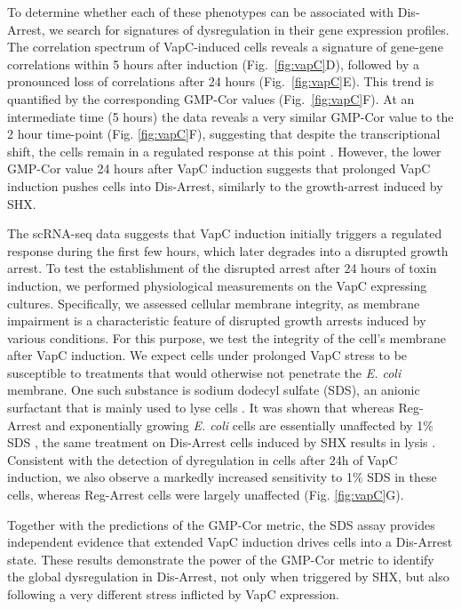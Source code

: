 \documentclass[12pt]{article}
\begin{document}
To determine whether each of these phenotypes can be associated with Dis-Arrest, we search for signatures of dysregulation in their gene expression profiles. The correlation spectrum of VapC-induced cells reveals a signature of gene-gene correlations within 5 hours after induction (Fig.~\ref{fig:vapC}D), followed by a pronounced loss of correlations after 24 hours (Fig.~\ref{fig:vapC}E). This trend is quantified by the corresponding GMP-Cor values (Fig.~\ref{fig:vapC}F). At an intermediate time (5 hours) the data reveals a very similar GMP-Cor value to the 2 hour time-point (Fig. \ref{fig:vapC}F), suggesting that despite the transcriptional shift, the cells remain in a regulated response at this point \cite{Ronine2025}. However, the lower GMP-Cor value 24 hours after VapC induction suggests that prolonged VapC induction pushes cells into Dis-Arrest, similarly to the growth-arrest induced by SHX.\par
The scRNA-seq data suggests that VapC induction initially triggers a regulated response during the first few hours, which later degrades into a disrupted growth arrest. To test the establishment of the disrupted arrest after 24 hours of toxin induction, we performed physiological measurements on the VapC expressing cultures. Specifically, we assessed cellular membrane integrity, as membrane impairment is a characteristic feature of disrupted growth arrests induced by various conditions\cite{Rotem2024}. For this purpose, we test the integrity of the cell's membrane after VapC induction. We expect cells under prolonged VapC stress to be susceptible to treatments that would otherwise not penetrate the \textit{E. coli} membrane. One such substance is sodium dodecyl sulfate (SDS), an anionic surfactant that is mainly used to lyse cells \cite{Shehadul2017}. It was shown that whereas Reg-Arrest and exponentially growing \textit{E. coli} cells are essentially unaffected by 1\% SDS \cite{Mitchell2017,Woldringh1972}, the same treatment on Dis-Arrest cells induced by SHX results in lysis \cite{Rotem2024}. Consistent with the detection of dyregulation in cells after 24h of VapC induction, we also observe a markedly increased sensitivity to 1\% SDS in these cells, whereas Reg-Arrest cells were largely unaffected (Fig. \ref{fig:vapC}G).\par
Together with the predictions of the GMP-Cor metric, the SDS assay provides independent evidence that extended VapC induction drives cells into a Dis-Arrest state. These results demonstrate the power of the GMP-Cor metric to identify the global dysregulation in Dis-Arrest, not only when triggered by SHX, but also following a very different stress inflicted by VapC expression.\par
\end{document}
